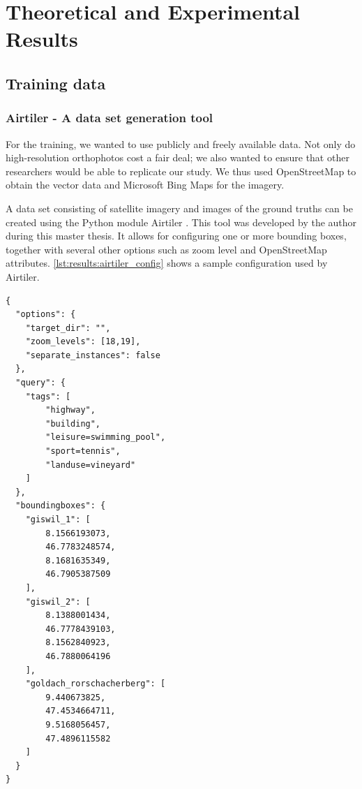 
\chapter{Theoretical and Experimental Results}\label{chp:theoretical_and_experimental_results}
\section{Training data}
\subsection{Airtiler - A data set generation tool}
For the training, we wanted to use publicly and freely available data. Not only do high-resolution orthophotos cost a fair deal; we also wanted to ensure that other researchers would be able to replicate our study. We thus used OpenStreetMap to obtain the vector data and Microsoft Bing Maps for the imagery.

A data set consisting of satellite imagery and images of the ground truths can be created using the Python module Airtiler \cite{airtiler}. This tool was developed by the author during this master thesis. It allows for configuring one or more bounding boxes, together with several other options such as zoom level and OpenStreetMap attributes. \autoref{lst:results:airtiler_config} shows a sample configuration used by Airtiler.

\begin{minipage}{\linewidth}
\begin{lstlisting}[caption={Sample configuration for Airtiler},captionpos=b,label=lst:results:airtiler_config]
{
  "options": {
    "target_dir": "",
    "zoom_levels": [18,19],
    "separate_instances": false
  },
  "query": {
    "tags": [
    	"highway",
    	"building",
    	"leisure=swimming_pool",
    	"sport=tennis",
    	"landuse=vineyard"
    ]
  },
  "boundingboxes": {
    "giswil_1": [
    	8.1566193073,
    	46.7783248574,
    	8.1681635349,
    	46.7905387509
    ],
    "giswil_2": [
    	8.1388001434,
    	46.7778439103,
    	8.1562840923,
    	46.7880064196
    ],
    "goldach_rorschacherberg": [
    	9.440673825,
    	47.4534664711,
    	9.5168056457,
    	47.4896115582
    ]
  }
}
\end{lstlisting}
\end{minipage}

